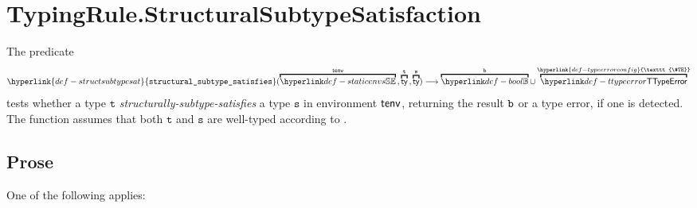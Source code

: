 \documentclass{book}
\newcommand\TypeErrorConfig[0]{\hyperlink{def-typeerrorconfig}{\texttt{\#TE}}}
\newcommand\structsubtypesat[0]{\hyperlink{def-structsubtypesat}{\texttt{structural\_subtype\_satisfies}}}
\newcommand\vt[0]{\texttt{t}}
\newcommand\vs[0]{\texttt{s}}
\begin{document}
\section{TypingRule.StructuralSubtypeSatisfaction\label{sec:TypingRule.StructuralSubtypeSatisfaction}}
\hypertarget{def-structsubtypesat}{}
The predicate
\[
  \structsubtypesat(\overname{\staticenvs}{\tenv} \aslsep \overname{\ty}{\vt} \aslsep \overname{\ty}{\vs})
  \aslto \overname{\Bool}{\vb} \cup \overname{\TTypeError}{\TypeErrorConfig}
\]
tests whether a type $\vt$ \emph{structurally-subtype-satisfies} a type $\vs$ in environment $\textsf{tenv}$,
returning the result $\texttt{b}$ or a type error, if one is detected.
The function assumes that both $\vt$ and $\vs$ are well-typed according to .

\subsection{Prose}
One of the following applies:
\end{document}
